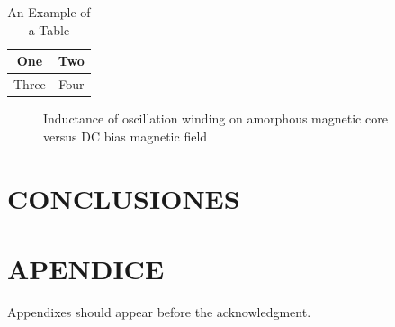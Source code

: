 \documentclass[a4paper, 10pt, onecolumn,journal]{ieeeconf}
\begin{document}
\begin{table}[h]
\caption{An Example of a Table}
\label{table_example}
\begin{center}
\begin{tabular}{|c||c|}
\hline
One & Two\\
\hline
Three & Four\\
\hline
\end{tabular}
\end{center}
\end{table}


   \begin{figure}[thpb]
      \centering
      \caption{Inductance of oscillation winding on amorphous
       magnetic core versus DC bias magnetic field}
      \label{figurelabel}
   \end{figure}

\section{CONCLUSIONES}


\addtolength{\textheight}{-12cm}   %







\section*{APENDICE}

Appendixes should appear before the acknowledgment.
\end{document}
